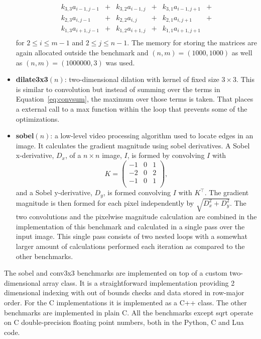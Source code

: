 \documentclass[preprint]{sigplanconf}
\begin{document}
\begin{itemize}
\begin{equation}
\begin{array}{lclclc}
    k_{3,3} a_{i-1,j-1} &+& k_{3,2} a_{i-1,j} &+& k_{3,1} a_{i-1,j+1} & + \\
    k_{2,3} a_{i,j-1}   &+& k_{2,2} a_{i,j}   &+& k_{2,1} a_{i,j+1}   & + \\
    k_{1,3} a_{i+1,j-1} &+& k_{1,2} a_{i+1,j} &+& k_{1,1} a_{i+1,j+1}  \\
  \end{array}
\end{equation}
for $2 \leq i \leq m-1$ and $2 \leq j \leq n-1$.
The memory for storing the matrices are again allocated outside the benchmark and $(n,m)=(1000,1000)$ 
as well as $(n,m)=(1000000,3)$ was used.
\item {\bf dilate3x3}$\left(n\right)$: two-dimensional dilation with kernel of fixed
  size $3 \times 3$. This is similar to convolution but instead of
  summing over the terms in Equation~\ref{eq:convsum}, the maximum over those terms is taken. That places a
  external call to a max function within the loop that prevents some
  of the optimizations.
\item {\bf sobel}$\left(n\right)$: a low-level video processing algorithm used to
  locate edges in an image. It calculates the gradient magnitude
  using sobel derivatives. A Sobel x-derivative, $D_x$, of a $n \times n$ image, ${I}$, is formed
by convolving ${I}$ with
\begin{equation}
  {K} = \left(
  \begin{array}{ccc}
    -1 & 0 & 1 \\
    -2 & 0 & 2 \\
    -1 & 0 & 1 \\
  \end{array}
  \right) ,
\end{equation}
and a Sobel y-derivative, $D_y$, is formed convolving $I$ with $K^\top$. The gradient magnitude is 
then formed for each pixel independently by $\sqrt{D_x^2 + D_y^2}$. The two convolutions and the pixelwise
magnitude calculation are combined in the implementation of this benchmark and calculated in a single pass over
the input image. This single pass consists of two nested loops with a somewhat larger amount of calculations 
performed each iteration as compared to the other benchmarks.
\end{itemize}

The sobel and conv3x3 benchmarks are implemented
on top of a custom two-dimensional array class.
It is
a straightforward implementation providing 2 dimensional
indexing with out of bounds checks and 
data stored in row-major order.
For the C implementations it is
implemented as a C++ class. The other benchmarks are implemented in
plain C. All the benchmarks except sqrt operate on C double-precision floating
point numbers, both in the Python, C and Lua code.
\end{document}
